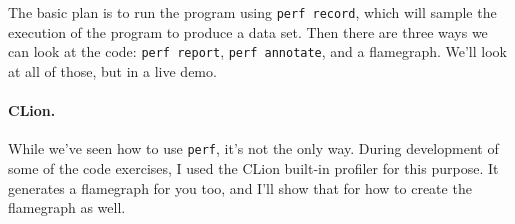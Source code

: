 The basic plan is to run the program using \texttt{perf record}, which will sample the execution of the program to produce a data set. Then there are three ways we can look at the code: \texttt{perf report}, \texttt{perf annotate}, and a flamegraph. We'll look at all of those, but in a live demo.


\paragraph{CLion.} While we've seen how to use \texttt{perf}, it's not the only way. During development of some of the code exercises, I used the CLion built-in profiler for this purpose. It generates a flamegraph for you too, and I'll show that for how to create the flamegraph as well.




